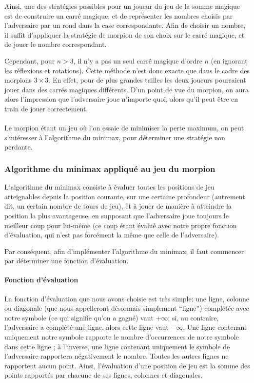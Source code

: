 Ainsi, une des stratégies possibles pour un joueur du jeu de la somme
magique est de construire un carré magique, et de représenter les
nombres choisis par l'adversaire par un rond dans la case
correspondante. Afin de choisir un nombre, il suffit d'appliquer la
stratégie de morpion de son choix sur le carré magique, et de
jouer le nombre correspondant.

Cependant, pour $n>3$, il n'y a pas un seul carré magique d'ordre $n$ (en
ignorant les réflexions et rotations). Cette méthode n'est donc exacte que dans
le cadre des morpions $3\times 3$. En effet, pour de plus grandes tailles les
deux joueurs pourraient jouer dans des carrés magiques différents. D'un point
de vue du morpion, on aura alors l'impression que l'adversaire joue n'importe
quoi, alors qu'il peut être en train de jouer correctement.

\paragraph{}
Le morpion étant un jeu où l'on essaie de minimiser la perte maximum,
on peut s'intéresser à l'algorithme du minimax, pour déterminer une
stratégie non perdante.

\subsubsection{Algorithme du minimax appliqué au jeu du morpion}
L'algorithme du minimax consiste à évaluer toutes les positions de jeu
atteignables depuis la position courante, sur une certaine profondeur
(autrement dit, un certain nombre de tours de jeu), et à jouer de
manière à atteindre la position la plus avantageuse, en supposant que
l'adversaire joue toujours le meilleur coup pour lui-même (ce coup
étant évalué avec notre propre fonction d'évaluation, qui n'est pas
forcément la même que celle de l'adversaire).

Par conséquent, afin d'implémenter l'algorithme du minimax, il faut
commencer par déterminer une fonction d'évaluation.

\paragraph{Fonction d'évaluation}
La fonction d'évaluation que nous avons choisie est très simple: une
ligne, colonne ou diagonale (que nous appelleront désormais simplement
``ligne'') complétée avec notre symbole (ce qui signifie qu'on a
gagné) vaut $+\infty$; si, au contraire, l'adversaire a complété une
ligne, alors cette ligne vaut $-\infty$. Une ligne contenant
uniquement notre symbole rapporte le nombre d'occurrences de notre
symbole dans cette ligne ; à l'inverse, une ligne contenant uniquement
le symbole de l'adversaire rapportera négativement le nombre.
Toutes les autres lignes ne rapportent aucun point.
Ainsi, l'évaluation d'une position de jeu est la somme des points
rapportés par chacune de ses lignes, colonnes et diagonales.


